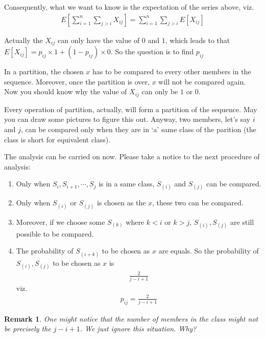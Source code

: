 \documentclass[a4paper, 10pt]{ctexart} %
\newtheorem{remark}{Remark}
\begin{document}
Consequently, what we want to know is the expectation of the series above,
viz. 
\begin{align*}
    E \left[ \sum_{i=1} ^{n} \sum_{j > i}  X_{ij} \right] = \sum_{i=1}^{n} \sum_{ j > i}  E\left[ X_{ij} \right]
\end{align*}

Actually the 
$X_{ij}$ can only have the value of 
$0 $ and $ 1$, which leads to that 
$E \left[ X_{ij} \right] =  p_{ij} \times 1 + \left(1-  p_{ij} \right) \times 0$.
So the question is to find $p_{ij}$

In a partition, the chosen $x$ has to be compared to every 
other members in the sequence.
Moreover, once the partition is over, 
$x $ will not be compared again. Now you should know why the value of $X_{ij}$ can only be $1 $ or $0$.

Every operation of partition, actually, will form a partition of 
the sequence. May you can draw some pictures to figure this out.
Anyway, two members, let's say $i$ and $j$, can be compared only when they are 
in `a' same class of the parition (the class is short for equivalent class). 

The analysis can be carried on now. Please take a notice to the next procedure of analysis: 
\begin{enumerate}
    \item Only when $S_{i} , S_{i + 1} , \cdots  , S_{j}$ is in a same class, $S_{(i)}$ and $S_{\left(j\right)}$ can be compared.
    \item Only when $S_{\left(i\right)} $ or $S_{\left(j\right)}$ is chosen as the $x$, these two can be compared.
    \item Moreover, if we choose some $S_{\left(k\right)}$ where $k< i$ or $k > j$, $S_{(i)}, S_{(j)}$ are still possible to be compared.
    \item The probability of $S_{\left(i +k\right)}$ to be chosen as $x$ are equals. So the probability of $S_{\left(i\right)} , S_{\left(j\right)}$ to be chosen as $x$ is 
    \begin{align*}
        \frac{2}{ j   - i + 1}
    \end{align*}
    viz. 
    \begin{align*}
        p_{ij} =  \frac{2}{ j  -i + 1}
    \end{align*}
\end{enumerate}
\begin{remark}
    One might notice that the number of members in the class might not be precisely the $j - i + 1$.
    We just ignore this situation. Why?
\end{remark}
\end{document}

